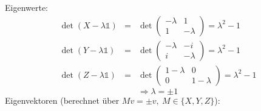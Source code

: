 \begin{enumerate}
                \twobeg
                Eigenwerte:
                \begin{eqnarray*}
                        \det(X-\lambda\mathds{1}) &=& \det\begin{pmatrix}-\lambda&1\\1&-\lambda\end{pmatrix} = \lambda^2 - 1 \\
                        \det(Y-\lambda\mathds{1}) &=& \det\begin{pmatrix}-\lambda&-i\\i&-\lambda\end{pmatrix} = \lambda^2 - 1 \\
                        \det(Z-\lambda\mathds{1}) &=& \det\begin{pmatrix}1-\lambda&0\\0&1-\lambda\end{pmatrix} = \lambda^2 - 1
                \end{eqnarray*}
                \[ \Rightarrow \lambda = \pm 1 \]
                \twomid
              Eigenvektoren (berechnet über $Mv = \pm v, \ M \in \{X, Y, Z\}$):


\end{enumerate}

